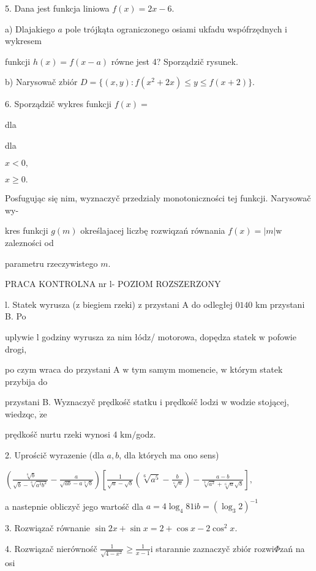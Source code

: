\documentclass[a4paper,12pt]{article}
\begin{document}
5. Dana jest funkcja liniowa $f(x)=2x-6.$

a) Dlajakiego $a$ pole trójkąta ograniczonego osiami ukfadu wspófrzędnych $\mathrm{i}$ wykresem

funkcji $h(x)=f(x-a)$ równe jest 4? Sporządzič rysunek.

b) Narysowač zbiór $D=\{(x,y):f(x^{2}+2x)\leq y\leq f(x+2)\}.$

6. Sporządzič wykres funkcji $f(x)=$

dla

dla

$x<0,$

$x\geq 0.$

Posfugując się nim, wyznaczyč przedzialy monotoniczności tej funkcji. Narysowač wy-

kres funkcji $g(m)$ określajacej liczbę rozwiqzań równania $f(x)=|m| \mathrm{w}$ zalezności od

parametru rzeczywistego $m.$




PRACA KONTROLNA nr l- POZIOM ROZSZERZONY

l. Statek wyrusza ($\mathrm{z}$ biegiem rzeki) $\mathrm{z}$ przystani A do odległej $0 140$ km przystani B. Po

uplywie l godziny wyrusza za nim łódz/ motorowa, dopędza statek $\mathrm{w}$ pofowie drogi,

po czym wraca do przystani A $\mathrm{w}$ tym samym momencie, $\mathrm{w}$ którym statek przybija do

przystani B. Wyznaczyč prędkośč statku $\mathrm{i}$ prędkośč lodzi $\mathrm{w}$ wodzie stojącej, wiedzqc, $\dot{\mathrm{z}}\mathrm{e}$

prędkośč nurtu rzeki wynosi 4 $\mathrm{k}\mathrm{m}/$godz.

2. Uprościč wyrazenie (dla $a, b$, dla których ma ono sens)

$(\displaystyle \frac{\sqrt[6]{b}}{\sqrt{b}-\sqrt[6]{a^{3}b^{2}}}-\frac{a}{\sqrt{ab}-a\sqrt[3]{b}})[\frac{1}{\sqrt{a}-\sqrt{b}}(\sqrt[6]{a^{5}}-\frac{b}{\sqrt[6]{a}})-\frac{a-b}{\sqrt[3]{a^{2}}+\sqrt[6]{a}\sqrt{b}}],$

a nastepnie obliczyč jego wartośč dla $a=4\log_{4}81 \mathrm{i} b=(\log_{3}2)^{-1}$

3. Rozwiązač równanie $\sin 2x+\sin x=2+\cos x-2\cos^{2}x.$

4. Rozwiązač nierównośč $\displaystyle \frac{1}{\sqrt{4-x^{2}}}\geq\frac{1}{x-1} \mathrm{i}$ starannie zaznaczyč zbiór rozwi$\Phi$zań na osi
\end{document}
